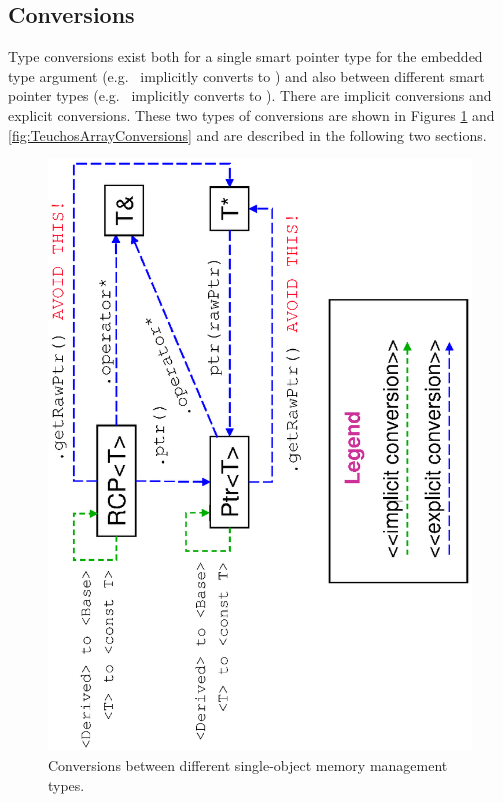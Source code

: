\documentclass[pdf,ps2pdf,11pt]{SANDreport}
\begin{document}
%
{}\subsection{Conversions}
\label{sec:conversions}
%

Type conversions exist both for a single smart pointer type for the
embedded type argument (e.g.\ {} implicitly converts to
{}) and also between different smart pointer
types (e.g.\ {} implicitly converts to
{}).  There are implicit conversions and explicit
conversions.  These two types of conversions are shown in Figures
{}\ref{fig:TeuchosPtrConversions} and
{}\ref{fig:TeuchosArrayConversions} and are described in the following
two sections.


{\bsinglespace
\begin{figure}[p]
\begin{center}
\includegraphics*[angle=270,scale=0.50]{TeuchosPtrConversions}
\end{center}
\caption{
\label{fig:TeuchosPtrConversions}
Conversions between different single-object memory management types.}
\end{figure}
\esinglespace}
\end{document}
